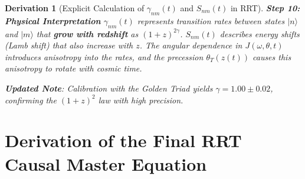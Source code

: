\documentclass[10pt, a4paper]{article}
\newtheorem{derivation}{Derivation}
\begin{document}
\begin{derivation}[Explicit Calculation of $\gamma_{nm}(t)$ and $S_{nm}(t)$ in RRT]
\textbf{Step 10: Physical Interpretation}
$\gamma_{nm}(t)$ represents transition rates between states $|n\rangle$ and $|m\rangle$ that \textbf{grow with redshift} as $(1+z)^{2\gamma}$. $S_{nm}(t)$ describes energy shifts (Lamb shift) that also increase with $z$. The angular dependence in $J(\omega,\theta,t)$ introduces anisotropy into the rates, and the precession $\theta_T(z(t))$ causes this anisotropy to rotate with cosmic time.

\textbf{Updated Note}: Calibration with the Golden Triad yields $\gamma = 1.00 \pm 0.02$, confirming the $(1+z)^2$ law with high precision.
\end{derivation}

\section{Derivation of the Final RRT Causal Master Equation}
\end{document}
